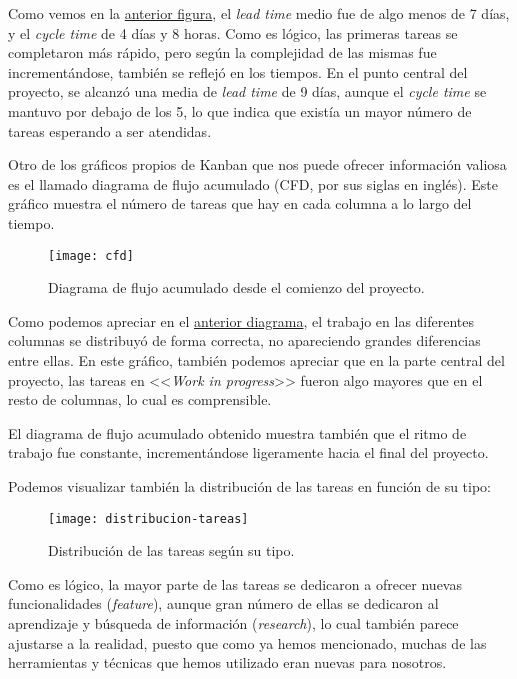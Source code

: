 Como vemos en la \hyperref[average-lead-cycle]{anterior figura}, el \emph{lead time} medio fue de algo menos de 7 días, y el \emph{cycle time} de 4 días y 8 horas. Como es lógico, las primeras tareas se completaron más rápido, pero según la complejidad de las mismas fue incrementándose, también se reflejó en los tiempos. En el punto central del proyecto, se alcanzó una media de \emph{lead time} de 9 días, aunque el \emph{cycle time} se mantuvo por debajo de los 5, lo que indica que existía un mayor número de tareas esperando a ser atendidas.

Otro de los gráficos propios de Kanban que nos puede ofrecer información valiosa es el llamado diagrama de flujo acumulado (CFD, por sus siglas en inglés). Este gráfico muestra el número de tareas que hay en cada columna a lo largo del tiempo.

\begin{figure}[h]
	\centering
	\texttt{[image: cfd]}
	\vspace{-0.7cm}
	\caption{Diagrama de flujo acumulado desde el comienzo del proyecto.}
	\label{cfd}
\end{figure}

Como podemos apreciar en el \hyperref[cfd]{anterior diagrama}, el trabajo en las diferentes columnas se distribuyó de forma correcta, no apareciendo grandes diferencias entre ellas. En este gráfico, también podemos apreciar que en la parte central del proyecto, las tareas en <<\emph{Work in progress}>> fueron algo mayores que en el resto de columnas, lo cual es comprensible.

El diagrama de flujo acumulado obtenido muestra también que el ritmo de trabajo fue constante, incrementándose ligeramente hacia el final del proyecto.

Podemos visualizar también la distribución de las tareas en función de su tipo:

\begin{figure}[h]
	\centering
	\texttt{[image: distribucion-tareas]}
	\caption{Distribución de las tareas según su tipo.}
\end{figure}

Como es lógico, la mayor parte de las tareas se dedicaron a ofrecer nuevas funcionalidades (\emph{feature}), aunque gran número de ellas se dedicaron al aprendizaje y búsqueda de información (\emph{research}), lo cual también parece ajustarse a la realidad, puesto que como ya hemos mencionado, muchas de las herramientas y técnicas que hemos utilizado eran nuevas para nosotros. 

